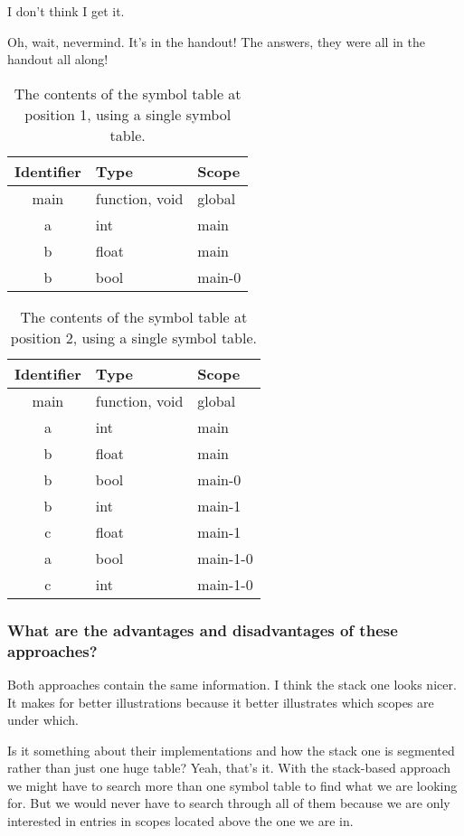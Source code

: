 I don't think I get it.

Oh, wait, nevermind.
It's in the handout!
The answers, they were all in the handout all along!

\begin{table}[H]
\begin{tabular}{|c|l|l|}
	\hline
	Identifier & Type			& Scope \\ \hline
	main	& function, void& global \\
	a		& int			& main	\\
	b		& float			& main	\\
	b		& bool			& main-0 \\
	\hline
\end{tabular}
\label{tab:2-b-1}
\caption{The contents of the symbol table at position 1, using a single symbol table.}
\end{table}

\begin{table}[H]
\begin{tabular}{|c|l|l|}
	\hline
	Identifier& Type			& Scope \\ \hline
	main	& function, void& global \\
	a		& int			& main	\\
	b		& float			& main	\\
	b		& bool			& main-0 \\
	b		& int			& main-1 \\
	c		& float			& main-1 \\
	a		& bool			& main-1-0 \\
	c		& int			& main-1-0 \\
	\hline
\end{tabular}
\label{tab:2-b-2}
\caption{The contents of the symbol table at position 2, using a single symbol table.}
\end{table}

\subsubsection{What are the advantages and disadvantages of these approaches?}
Both approaches contain the same information.
I think the stack one looks nicer.
It makes for better illustrations because it better illustrates which scopes are under which.

Is it something about their implementations and how the stack one is segmented rather than just one huge table?
Yeah, that's it.
With the stack-based approach we might have to search more than one symbol table to find what we are looking for.
But we would never have to search through all of them because we are only interested in entries in scopes located above the one we are in.

